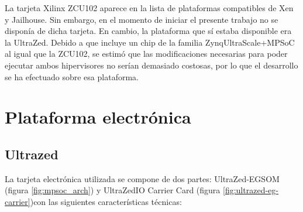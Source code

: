 La tarjeta Xilinx ZCU102 aparece en la lista de plataformas compatibles de Xen y Jailhouse. Sin embargo, en el momento de iniciar el presente trabajo no se disponía de dicha tarjeta. En cambio, la plataforma que sí estaba disponible era la UltraZed\texttrademark. Debido a que incluye un chip de la familia Zynq\textregistered UltraScale+\texttrademark MPSoC al igual que la ZCU102, se estimó que las modificaciones necesarias para poder ejecutar ambos hipervisores no serían demasiado costosas, por lo que el desarrollo se ha efectuado sobre esa plataforma.

\section{Plataforma electrónica}
\subsection{Ultrazed\texttrademark}
La tarjeta electrónica utilizada se compone de dos partes: UltraZed-EG\texttrademark \acrshort{SOM} (figura \ref{fig:mpsoc_arch}) y UltraZed\texttrademark IO Carrier Card (figura \ref{fig:ultrazed-eg-carrier})con las siguientes características técnicas:
